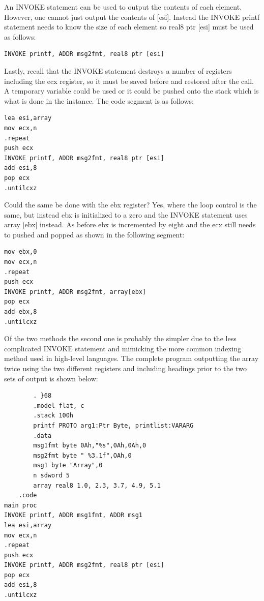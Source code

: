 \documentclass[10pt]{book}
\begin{document}
An INVOKE statement can be used to output the contents of each element. However, one cannot just output the contents of [esi]. Instead the INVOKE printf statement needs to know the size of each element so real8 ptr [esi] must be used as follows:

\begin{verbatim}
INVOKE printf, ADDR msg2fmt, real8 ptr [esi]
\end{verbatim}

Lastly, recall that the INVOKE statement destroys a number of registers including the ecx register, so it must be saved before and restored after the call. A temporary variable could be used or it could be pushed onto the stack which is what is done in the instance. The code segment is as follows:

\begin{verbatim}
lea esi,array
mov ecx,n
.repeat
push ecx
INVOKE printf, ADDR msg2fmt, real8 ptr [esi]
add esi,8
pop ecx
.untilcxz
\end{verbatim}

Could the same be done with the ebx register? Yes, where the loop control is the same, but instead ebx is initialized to a zero and the INVOKE statement uses array [ebx] instead. As before ebx is incremented by eight and the ecx still needs to pushed and popped as shown in the following segment:

\begin{verbatim}
mov ebx,0
mov ecx,n
.repeat
push ecx
INVOKE printf, ADDR msg2fmt, array[ebx]
pop ecx
add ebx,8
.untilcxz
\end{verbatim}

Of the two methods the second one is probably the simpler due to the less complicated INVOKE statement and mimicking the more common indexing method used in high-level languages. The complete program outputting the array twice using the two different registers and including headings prior to the two sets of output is shown below:

\begin{verbatim}
        . }68
        .model flat, c
        .stack 100h
        printf PROTO arg1:Ptr Byte, printlist:VARARG
        .data
        msg1fmt byte 0Ah,"%s",0Ah,0Ah,0
        msg2fmt byte " %3.1f",OAh,0
        msg1 byte "Array",0
        n sdword 5
        array real8 1.0, 2.3, 3.7, 4.9, 5.1
    .code
main proc
INVOKE printf, ADDR msg1fmt, ADDR msg1
lea esi,array
mov ecx,n
.repeat
push ecx
INVOKE printf, ADDR msg2fmt, real8 ptr [esi]
pop ecx
add esi,8
.untilcxz
\end{verbatim}
\end{document}
